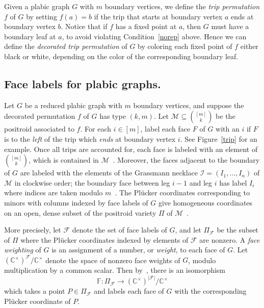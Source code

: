 \documentclass[10pt]{amsart}
\theoremstyle{definition}
\begin{document}
Given a plabic graph $G$ with $m$ boundary vertices, we define the \emph{trip permutation} 
$f$
of $G$ by setting 
\begin{math} f(a) = b\end{math}
if the trip that starts at boundary vertex $a$ ends at boundary vertex $b$. Notice that if $f$ has a fixed point at $a$, then $G$ must have a boundary leaf at $a$, to avoid violating Condition~\ref{norep} above. Hence we can define the \emph{decorated trip permutation} of $G$ by coloring each fixed point of $f$ either black or white, depending on the color of the corresponding boundary leaf. 


\subsection{Face labels for plabic graphs.}
\label{faces}

Let $G$ be a reduced plabic graph with $m$ boundary vertices, and suppose the decorated permutation $f$ of $G$ has type $(k,m)$. 
Let $\mathcal{M} \subseteq \binom{[m]}{k}$ be the positroid associated to $f$. 
For each $i \in [m]$, label each face $F$ of $G$ with an $i$ if $F$ is to the \emph{left} of the trip which \emph{ends} at boundary vertex $i$. See Figure~\ref{trip} for an example. Once all trips are accounted for, each face is labeled with an element of $\binom{[m]}{k}$, which is contained in $\mathcal{M}$~\cite{JS06}. Moreover, the faces adjacent to the boundary of $G$ are labeled with the elements of the Grassmann necklace $\mathcal{I}=(I_1,\ldots,I_n)$ of $\mathcal{M}$ in clockwise order; the boundary face between leg $i-1$ and leg $i$ has label $I_i$ where indices are taken modulo $m$~\cite{OPS15}. The Pl{\"u}cker coordinates corresponding to minors with columns indexed by face labels of $G$ give homogeneous coordinates on an open, dense subset of the positroid variety $\Pi$ of $\mathcal{M}$~\cite{MS17}.

More precisely, let $\mathcal{F}$ denote the set of face labels of $G$, and let $\Pi_{\mathcal{F}}$ be the subset of $\Pi$ where the Pl{\"u}cker coordinates indexed by elements of $\mathcal{F}$ are nonzero. A \emph{face weighting} of $G$ is an assignment of a number, or \emph{weight}, to each face of $G$. Let $(\mathbb{C}^{\times})^{\mathcal{F}}/\mathbb{C}^{\times}$ denote the space of nonzero face weights of $G$, modulo multiplication by a common scalar. Then by~\cite[Theorem 7.1]{MS17}, there is an isomorphism
\[\mathbb{F}: \Pi_{\mathcal{F}} \rightarrow (\mathbb{C}^{\times})^{|\mathcal{F}|}/\mathbb{C}^{\times}\]
which takes a point $P \in \Pi_{\mathcal{F}}$ and labels each face of $G$ with the corresponding Pl{\"u}cker coordinate of $P$. 
\end{document}
